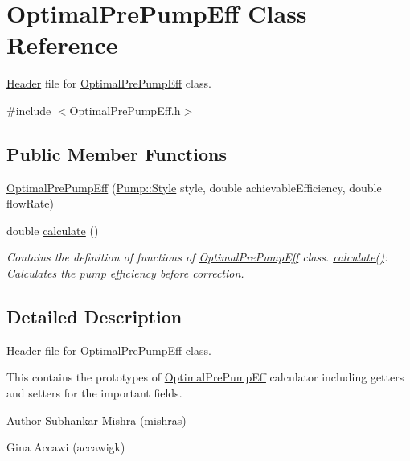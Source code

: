 \hypertarget{class_optimal_pre_pump_eff}{}\section{Optimal\+Pre\+Pump\+Eff Class Reference}
\label{class_optimal_pre_pump_eff}


\hyperlink{class_header}{Header} file for \hyperlink{class_optimal_pre_pump_eff}{Optimal\+Pre\+Pump\+Eff} class.  




{\ttfamily \#include $<$Optimal\+Pre\+Pump\+Eff.\+h$>$}

\subsection*{Public Member Functions}
\begin{DoxyCompactItemize}
\item 
\hyperlink{class_optimal_pre_pump_eff_ade47f817645cb2d503bd99f132bec1e6}{Optimal\+Pre\+Pump\+Eff} (\hyperlink{class_pump_aef354601ce4218258cc898b35a1e90ff}{Pump\+::\+Style} style, double achievable\+Efficiency, double flow\+Rate)
\item 
double \hyperlink{class_optimal_pre_pump_eff_a7ced63984a89975c4f8f54642701d841}{calculate} ()
\begin{DoxyCompactList}\small\item\em Contains the definition of functions of \hyperlink{class_optimal_pre_pump_eff}{Optimal\+Pre\+Pump\+Eff} class. \hyperlink{class_optimal_pre_pump_eff_a7ced63984a89975c4f8f54642701d841}{calculate()}\+: Calculates the pump efficiency before correction. \end{DoxyCompactList}\end{DoxyCompactItemize}


\subsection{Detailed Description}
\hyperlink{class_header}{Header} file for \hyperlink{class_optimal_pre_pump_eff}{Optimal\+Pre\+Pump\+Eff} class. 

This contains the prototypes of \hyperlink{class_optimal_pre_pump_eff}{Optimal\+Pre\+Pump\+Eff} calculator including getters and setters for the important fields.

\begin{DoxyAuthor}{Author}
Subhankar Mishra (mishras) 

Gina Accawi (accawigk) 
\end{DoxyAuthor}


